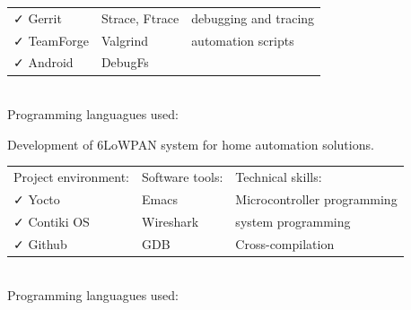 \documentclass[letterpaper]{jm-cv} %
\begin{document}
{\begin{tabular}{ l l l }
    {\color{mainblue}\faCheck} Gerrit &
    \hspace{1cm}{\color{maingreen}\faCheck} Strace, Ftrace &
    \hspace{1cm}{\color{maingray}\faCheck} debugging and tracing\\

    {\color{mainblue}\faCheck} TeamForge &
    \hspace{1cm}{\color{maingreen}\faCheck} Valgrind &
    \hspace{1cm}{\color{maingray}\faCheck} automation scripts \\

    {\color{mainblue}\faCheck} Android &
    \hspace{1cm}{\color{maingreen}\faCheck} DebugFs &

  \end{tabular}\\

  Programming languagues used:\\
}

\divider


\small {

  Development of 6LoWPAN system for home automation solutions.

  \begin{tabular}{ l l l }
    Project environment: & \hspace{1cm}Software tools: & \hspace{1cm}Technical skills:\\
    {\color{mainblue}\faCheck} Yocto &
    \hspace{1cm}{\color{maingreen}\faCheck} Emacs &
    \hspace{1cm}{\color{maingray}\faCheck} Microcontroller programming\\

    {\color{mainblue}\faCheck} Contiki OS &
    \hspace{1cm}{\color{maingreen}\faCheck} Wireshark &
    \hspace{1cm}{\color{maingray}\faCheck} system programming\\

    {\color{mainblue}\faCheck} Github &
    \hspace{1cm}{\color{maingreen}\faCheck} GDB &
    \hspace{1cm}{\color{maingray}\faCheck} Cross-compilation\\

  \end{tabular}\\

  Programming languagues used:\\
}
\end{document}
